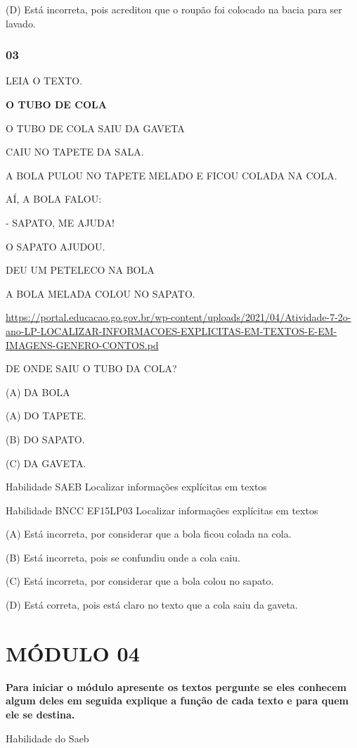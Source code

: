 (D) Está incorreta, pois acreditou que o roupão foi colocado na bacia
para ser lavado.

\subsubsection{03 }\label{section-41}

LEIA O TEXTO.

\textbf{O TUBO DE COLA}

O TUBO DE COLA SAIU DA GAVETA

CAIU NO TAPETE DA SALA.

A BOLA PULOU NO TAPETE MELADO E FICOU COLADA NA COLA.

AÍ, A BOLA FALOU:

- SAPATO, ME AJUDA!

O SAPATO AJUDOU.

DEU UM PETELECO NA BOLA

A BOLA MELADA COLOU NO SAPATO.

\url{https://portal.educacao.go.gov.br/wp-content/uploads/2021/04/Atividade-7-2o-ano-LP-LOCALIZAR-INFORMACOES-EXPLICITAS-EM-TEXTOS-E-EM-IMAGENS-GENERO-CONTOS.pd}

DE ONDE SAIU O TUBO DA COLA?

(A) DA BOLA

(A) DO TAPETE.

(B) DO SAPATO.

(C) DA GAVETA.

Habilidade SAEB Localizar informações explícitas em textos

Habilidade BNCC EF15LP03 Localizar informações explícitas em textos

(A) Está incorreta, por considerar que a bola ficou colada na cola.

(B) Está incorreta, pois se confundiu onde a cola caiu.

(C) Está incorreta, por considerar que a bola colou no sapato.

(D) Está correta, pois está claro no texto que a cola saiu da gaveta.

\section{MÓDULO 04}\label{muxf3dulo-04}

\textbf{Para iniciar o módulo apresente os textos pergunte se eles
conhecem algum deles em seguida explique a função de cada texto e para
quem ele se destina.}

\protect\hypertarget{_Hlk129197269}{}{}Habilidade do Saeb

